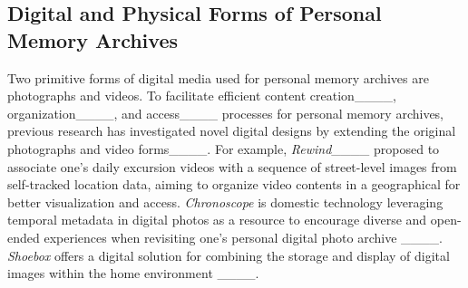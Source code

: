 \subsection{Digital and Physical Forms of Personal Memory Archives}
Two primitive forms of digital media used for personal memory archives are photographs and videos. 
To facilitate efficient content creation____, organization____, and access____ processes for personal memory archives, previous research has investigated novel digital designs by extending the original photographs and video forms____.
For example, \textit{Rewind}____ proposed to associate one's daily excursion videos with a sequence of street-level images from self-tracked location data, aiming to organize video contents in a geographical for better visualization and access.
\textit{Chronoscope} is domestic technology leveraging temporal metadata in digital photos as a resource to encourage diverse and open-ended experiences when revisiting one's personal digital photo archive ____. 
\emph{Shoebox} offers a digital solution for combining the storage and display of digital images within the home environment ____.

